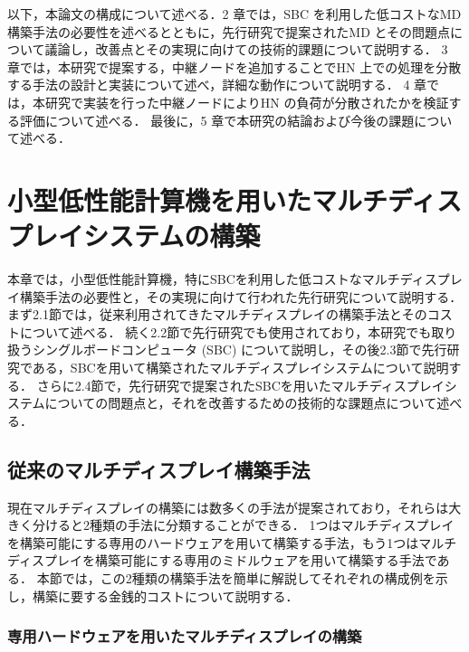 \documentclass[12pt,a4paper]{jbook}
\begin{document}
以下，本論文の構成について述べる．2 章では，SBC を利用した低コストなMD構築手法の必要性を述べるとともに，先行研究で提案されたMD とその問題点について議論し，改善点とその実現に向けての技術的課題について説明する．
3 章では，本研究で提案する，中継ノードを追加することでHN 上での処理を分散する手法の設計と実装について述べ，詳細な動作について説明する．
4 章では，本研究で実装を行った中継ノードによりHN の負荷が分散されたかを検証する評価について述べる．
最後に，5 章で本研究の結論および今後の課題について述べる\cite{docker}．

\chapter{小型低性能計算機を用いたマルチディスプレイシステムの構築}

本章では，小型低性能計算機，特にSBCを利用した低コストなマルチディスプレイ構築手法の必要性と，その実現に向けて行われた先行研究について説明する．
まず2.1節では，従来利用されてきたマルチディスプレイの構築手法とそのコストについて述べる．
続く2.2節で先行研究でも使用されており，本研究でも取り扱うシングルボードコンピュータ (SBC) について説明し，その後2.3節で先行研究である，SBCを用いて構築されたマルチディスプレイシステムについて説明する．
さらに2.4節で，先行研究で提案されたSBCを用いたマルチディスプレイシステムについての問題点と，それを改善するための技術的な課題点について述べる．

\section{従来のマルチディスプレイ構築手法}
現在マルチディスプレイの構築には数多くの手法が提案されており，それらは大きく分けると2種類の手法に分類することができる\cite{pccluster,6693038}．
1つはマルチディスプレイを構築可能にする専用のハードウェアを用いて構築する手法，もう1つはマルチディスプレイを構築可能にする専用のミドルウェアを用いて構築する手法である．
本節では，この2種類の構築手法を簡単に解説してそれぞれの構成例を示し，構築に要する金銭的コストについて説明する．

\subsection{専用ハードウェアを用いたマルチディスプレイの構築}
\end{document}
